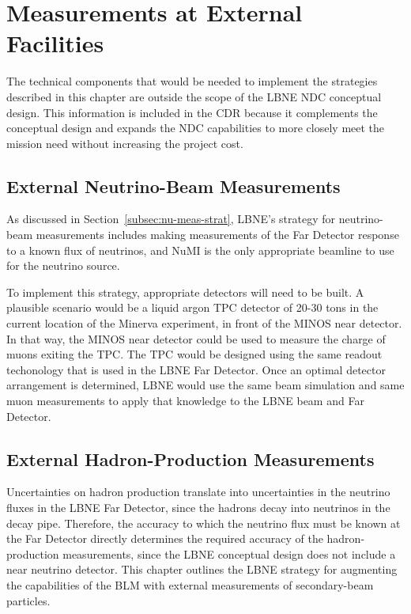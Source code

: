 
\chapter{Measurements at External Facilities}
\label{ch:ext-meas}


The technical components that would be needed to implement the strategies 
described in this chapter are outside the scope of the LBNE NDC conceptual 
design. This information is included in the CDR because it complements the conceptual 
design and expands the NDC capabilities to more closely meet the mission need without increasing the project cost.


\section{External Neutrino-Beam Measurements}
As discussed in Section~\ref{subsec:nu-meas-strat}, LBNE's strategy for neutrino-beam measurements includes making measurements of the Far Detector response to a known flux of neutrinos, and NuMI is the only appropriate beamline to use for the neutrino source.

To implement this strategy, appropriate detectors will need to be built.  A plausible scenario would be a liquid argon TPC detector of 20-30 tons in the current location of the Minerva experiment, in front of the MINOS near detector. In that way, the MINOS near detector could be used to measure the charge of muons exiting the TPC. The TPC would be designed using the same readout techonology that is used in the LBNE Far Detector.  Once an optimal detector arrangement is determined, LBNE would use the same beam simulation and same muon measurements to apply that knowledge to the LBNE beam and Far Detector.

\section{External Hadron-Production Measurements}
\label{sec:hadron}

Uncertainties on hadron production translate into uncertainties in the neutrino fluxes in the LBNE Far Detector, since the hadrons decay into neutrinos in the decay pipe.  
Therefore, the accuracy to which the neutrino flux must be known at the Far Detector directly determines the required accuracy 
of the hadron-production measurements, since the LBNE conceptual design does not include a near neutrino detector. This chapter outlines the LBNE strategy for augmenting the capabilities of the BLM with external measurements of secondary-beam particles.  

